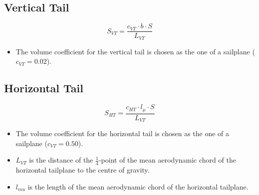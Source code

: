\documentclass[a4paper,12pt]{scrartcl}
\begin{document}
\subsection{Vertical Tail}
\[
	S_{VT} = \frac{c_{VT} \cdot b \cdot S}{L_{VT}}
\]
\begin{itemize}
	\item The volume coefficient for the vertical tail is chosen as the one of a sailplane ($c_{VT} = 0.02$).
\end{itemize}

\subsection{Horizontal Tail}
\[
	S_{HT} = \frac{c_{HT} \cdot l_\mu \cdot S}{L_{VT}}
\]
\begin{itemize}
	\item The volume coefficient for the horizontal tail is chosen as the one of a sailplane ($c_{VT} = 0.50$).
	\item $L_{VT}$ is the distance of the $\frac{1}{4}$-point of the mean aerodynamic chord of the horizontal tailplane to the centre of gravity.
	\item $l_{mu}$ is the length of the mean aerodynamic chord of the horizontal tailplane.
\end{itemize}

\newpage
\printbibliography
\end{document}
